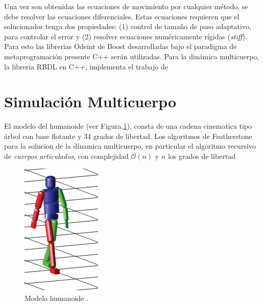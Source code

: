 \documentclass[journal,letterpaper,twoside,twocolumn]{IEEEtran}
\begin{document}
Una vez son obtenidas las ecuaciones de movimiento por cualquier método, se debe resolver las ecuaciones diferenciales. Estas ecuaciones requieren que el solucionador tenga dos propiedades: (1) control de tamaño de paso adaptativo, para controlar el error y (2) resolver ecuaciones numéricamente rígidas (\emph{stiff}). Para esto las librerias Odeint\cite{Ahnert2011} de Boost desarrolladas bajo el paradigma de metaprogramación presente C++ serán utilizadas. Para la dinámica multicuerpo, la libreria RBDL\cite{Felis2016} en C++, implementa el trabajo de\cite{Featherstone2008}

\section{Simulación Multicuerpo}
\label{sec:simula}
El modelo del humanoide (ver Figura.\ref{fig:humModel}), consta de una cadena cinematica tipo árbol con base flotante y 34 grados de libertad. Los algoritmos de Featherstone para la solucion de la dínamica multicuerpo, en particular el algoritmo recursivo de \emph{cuerpos articulados}, con complejidad $\mathcal{O}(n)$ y $n$ los grados de libertad
\begin{figure}[!t]
  \centering
  \includegraphics[scale=0.6]{Felis2016aHumanoidModel.png}
  \caption{Modelo humanoide \protect\cite{Felis2016a}.}
  \label{fig:humModel}
\end{figure}
\end{document}

